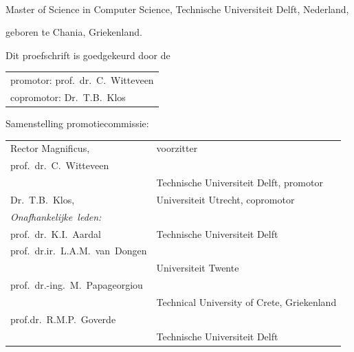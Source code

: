 \begin{titlepage}
\begin{center}
\makeatletter
{\Large\titlefont\bfseries\@firstname\ {\titleshape\@lastname}}
\makeatother

\bigskip
\bigskip

Master of Science in Computer Science, Technische Universiteit Delft, Nederland,


geboren te Chania, Griekenland.

\vspace*{2\bigskipamount}

\end{center}

\clearpage
\thispagestyle{empty}

\noindent Dit proefschrift is goedgekeurd door de

\medskip\noindent
\begin{tabular}{l}
    promotor: prof.\ dr.\ C.\ Witteveen \\
    copromotor: Dr.\ T.B.\ Klos
\end{tabular}

\bigskip
\noindent Samenstelling promotiecommissie:

\medskip\noindent
\begin{tabular}{p{3cm}l}
    Rector Magnificus, & voorzitter \\
	 \mbox{prof.\ dr.\ C.\ Witteveen} & \\ & Technische Universiteit Delft, promotor \\
    Dr.\ T.B.\ Klos, & Universiteit Utrecht, copromotor \\

    \medskip
    \mbox{\emph{Onafhankelijke leden:}} & \\

    prof.\ dr.\ K.I.\ Aardal & Technische Universiteit Delft \\
	 \mbox{prof.\ dr.ir.\ L.A.M.\ van Dongen} & \\ & Universiteit Twente \\
	 \mbox{prof.\ dr.-ing.\ M.\ Papageorgiou} & \\ & Technical University of Crete, Griekenland \\
	 \mbox{prof.dr.\ R.M.P.\ Goverde} & \\ & Technische Universiteit Delft \\


\end{tabular}
\end{titlepage}
